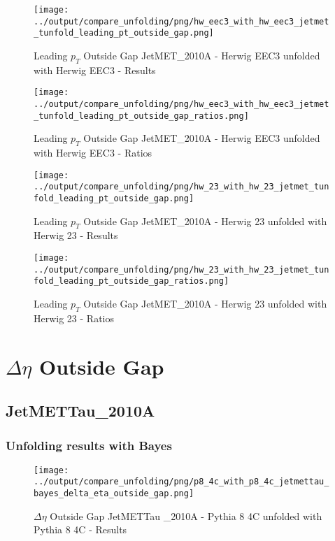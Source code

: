 \documentclass[11pt]{book}
\begin{document}
\begin{figure}[ht]
\centering
\texttt{[image: ../output/compare\_unfolding/png/hw\_eec3\_with\_hw\_eec3\_jetmet\_tunfold\_leading\_pt\_outside\_gap.png]}
\caption{Leading $p_{T}$ Outside Gap JetMET\_2010A - Herwig EEC3 unfolded with Herwig EEC3 - Results}
\label{hw_eec3_hw_eec3_jetmet_tunfold_leading_pt_outside_gap_a}
\end{figure}

\begin{figure}[ht]
\centering
\texttt{[image: ../output/compare\_unfolding/png/hw\_eec3\_with\_hw\_eec3\_jetmet\_tunfold\_leading\_pt\_outside\_gap\_ratios.png]}
\caption{Leading $p_{T}$ Outside Gap JetMET\_2010A - Herwig EEC3 unfolded with Herwig EEC3 - Ratios}
\label{hw_eec3_hw_eec3_jetmet_tunfold_leading_pt_outside_gap_b}
\end{figure}

\begin{figure}[ht]
\centering
\texttt{[image: ../output/compare\_unfolding/png/hw\_23\_with\_hw\_23\_jetmet\_tunfold\_leading\_pt\_outside\_gap.png]}
\caption{Leading $p_{T}$ Outside Gap JetMET\_2010A - Herwig 23 unfolded with Herwig 23 - Results}
\label{hw_23_hw_23_jetmet_tunfold_leading_pt_outside_gap_a}
\end{figure}

\begin{figure}[ht]
\centering
\texttt{[image: ../output/compare\_unfolding/png/hw\_23\_with\_hw\_23\_jetmet\_tunfold\_leading\_pt\_outside\_gap\_ratios.png]}
\caption{Leading $p_{T}$ Outside Gap JetMET\_2010A - Herwig 23 unfolded with Herwig 23 - Ratios}
\label{hw_23_hw_23_jetmet_tunfold_leading_pt_outside_gap_b}
\end{figure}


\cleardoublepage
\chapter{$\Delta\eta$ Outside Gap}
\section{JetMETTau\_2010A}
\subsection{Unfolding results with Bayes}


\begin{figure}[ht]
\centering
\texttt{[image: ../output/compare\_unfolding/png/p8\_4c\_with\_p8\_4c\_jetmettau\_bayes\_delta\_eta\_outside\_gap.png]}
\caption{$\Delta\eta$ Outside Gap JetMETTau \_2010A - Pythia 8 4C unfolded with Pythia 8 4C - Results}
\label{p8_p8_jetmettau_bayes_delta_eta_outside_gap_a}
\end{figure}
\end{document}
